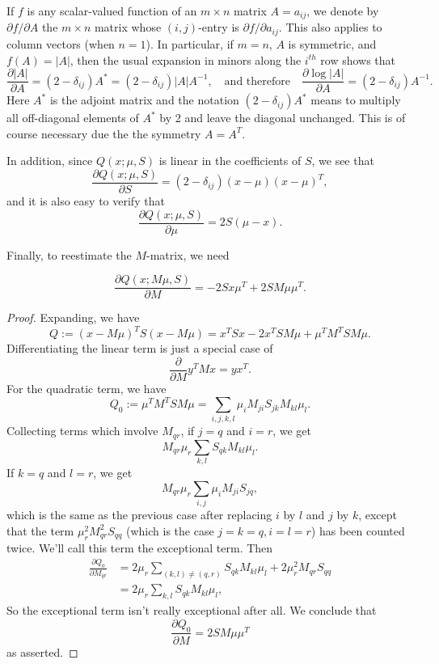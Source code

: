 \documentclass[12pt,leqno]{article}
\begin{document}
If $f$ is any scalar-valued function of an $m\times{n}$ matrix $A = a_{ij}$, we denote by $\partial{f}/\partial{A}$ the 
$m\times{n}$ matrix whose $(i,j)$-entry is $\partial{f}/\partial{a_{ij}}$.  This also applies to column vectors (when $n=1$).
In particular, if $m=n$, $A$ is symmetric, and $f(A) = |A|$,  then the usual expansion 
in minors along the $i^{th}$ row shows that 
$$
\frac{\partial{|A|}}{\partial{A}} = (2-\delta_{ij})A^* = (2-\delta_{ij})|A|A^{-1},\quad\text{and therefore}
\quad\frac{\partial{\log|A|}}{\partial{A}} = (2-\delta_{ij})A^{-1}. 
$$
Here $A^*$ is the adjoint matrix and the notation $(2-\delta_{ij})A^*$ means to multiply all off-diagonal elements of $A^*$ by 2
and leave the diagonal unchanged.  This is of course necessary due the the symmetry $A = A^T$.

In addition, since $Q(x;\mu,S)$ is linear in the coefficients of $S$, we see that
$$
\frac{\partial{Q(x;\mu,S)}}{\partial{S}} = (2-\delta_{ij})(x-\mu)(x-\mu)^T,
$$
and it is also easy to verify that
$$
\frac{\partial{Q(x;\mu,S)}}{\partial{\mu}} = 2S(\mu-x).
$$

Finally, to reestimate the $M$-matrix, we need

\begin{Lem}\label{dM}
  $$
  \frac{\partial{Q(x;M\mu,S)}}{\partial{M}} = -2Sx\mu^T + 2SM\mu\mu^T.
  $$
\end{Lem}
\begin{proof}
Expanding, we have
$$
Q := (x-M\mu)^TS(x-M\mu) = x^TSx - 2x^TSM\mu + \mu^TM^TSM\mu.
$$
Differentiating the linear term is just a special case of
$$
\frac{\partial}{\partial{M}}y^TMx = yx^T.
$$
For the quadratic term, we have
$$
Q_0 := \mu^TM^TSM\mu = \sum_{i,j,k,l}\mu_iM_{ji}S_{jk}M_{kl}\mu_l.
$$
Collecting terms which involve $M_{qr}$, if $j=q$ and $i=r$, we get
$$
M_{qr}\mu_r\sum_{k,l}S_{qk}M_{kl}\mu_l.
$$
If $k=q$ and $l=r$, we get
$$
M_{qr}\mu_r\sum_{i,j}\mu_iM_{ji}S_{jq},
$$
which is the same as the previous case after replacing $i$ by $l$ and $j$ by $k$, except
that the term $\mu_r^2M_{qr}^2S_{qq}$
(which is the case $j = k = q,i = l = r$) has been counted twice.
We'll call this term the exceptional term. Then
\begin{align*}
  \frac{\partial{Q_0}}{\partial{M_{qr}}} &= 2\mu_r\sum_{(k,l)\neq(q,r)}S_{qk}M_{kl}\mu_l + 2\mu_r^2M_{qr}S_{qq}\\
    &= 2\mu_r\sum_{k,l}S_{qk}M_{kl}\mu_l,
\end{align*}
So the exceptional term isn't really exceptional after all.  We conclude that
$$
\frac{\partial{Q_0}}{\partial{M}} = 2SM\mu\mu^T
$$
as asserted.
\end{proof}
      
\end{document}
